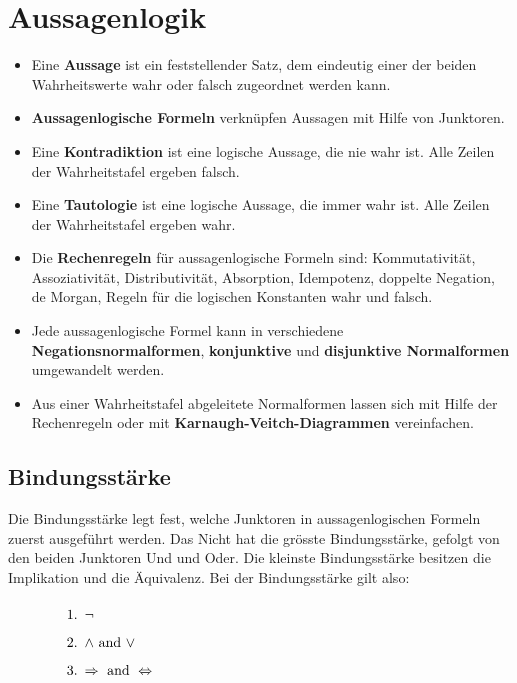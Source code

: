 \section{Aussagenlogik}
\begin{itemize}
    \item Eine \textbf{Aussage} ist ein feststellender Satz, dem eindeutig einer der beiden Wahrheitswerte wahr oder falsch zugeordnet werden kann.
    \item \textbf{Aussagenlogische Formeln} verknüpfen Aussagen mit Hilfe von Junktoren.
    \item Eine \textbf{Kontradiktion} ist eine logische Aussage, die nie wahr ist. Alle Zeilen der Wahrheitstafel ergeben falsch.
    \item Eine \textbf{Tautologie} ist eine logische Aussage, die immer wahr ist. Alle Zeilen der Wahrheitstafel ergeben wahr.
    \item Die \textbf{Rechenregeln} für aussagenlogische Formeln sind: Kommutativität, Assoziativität, Distributivität, Absorption, Idempotenz, doppelte Negation, de Morgan, Regeln für die logischen Konstanten wahr und falsch.
    \item Jede aussagenlogische Formel kann in verschiedene \textbf{Negationsnormalformen}, \textbf{konjunktive} und \textbf{disjunktive Normalformen} umgewandelt werden.
    \item Aus einer Wahrheitstafel abgeleitete Normalformen lassen sich mit Hilfe der Rechenregeln oder mit \textbf{Karnaugh-Veitch-Diagrammen} vereinfachen.
\end{itemize}
\subsection{Bindungsstärke}
Die Bindungsstärke legt fest, welche Junktoren in 
aussagenlogischen Formeln zuerst ausgeführt werden. Das Nicht hat die grösste 
Bindungsstärke, gefolgt von den beiden Junktoren Und und Oder. Die kleinste 
Bindungsstärke besitzen die Implikation und die Äquivalenz.
Bei der Bindungsstärke gilt also:
\begin{equation}
    \parbox{30em}{
        \begin{enumerate}
            \item \( \neg \)
            \item \( \land \text{ and } \lor \)
            \item \( \Rightarrow \text{ and } \Leftrightarrow \)
        \end{enumerate}}
\end{equation}
